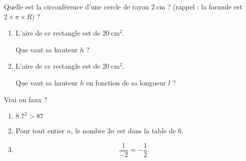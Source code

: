 \begin{MentalActivity}

    \begin{mental}
        Quelle est la circonférence d'une cercle de rayon \( \SI{2}{\centi\meter}\) ? (rappel : la formule est \( 2\times\pi\times R\)) ?
    \end{mental}

    \begin{mental}
        \begin{enumerate}
            \item
                L'aire de ce rectangle est de \(\SI{20}{\centi\meter\squared}\).
        \begin{center}
           
        \end{center}
        Que vaut sa hauteur \( h\) ?
            \item
                L'aire de ce rectangle est de \(\SI{20}{\centi\meter\squared}\).
                \begin{center}
                    
                \end{center}
                Que vaut sa hauteur \( h\) en fonction de sa longueur \( l\) ?
        \end{enumerate}
    \end{mental}

    \begin{mental}
        Vrai ou faux ?
        \begin{enumerate}
            \item
                \( 8.7^2>87\)
            \item
                Pour tout entier \( n\), le nombre \( 3n\) est dans la table de \( 6\).
            \item
                \begin{equation}
                    \frac{1}{ -2 }=-\frac{1}{ 2 }.
                \end{equation}
        \end{enumerate}
    \end{mental}
    
\end{MentalActivity}


